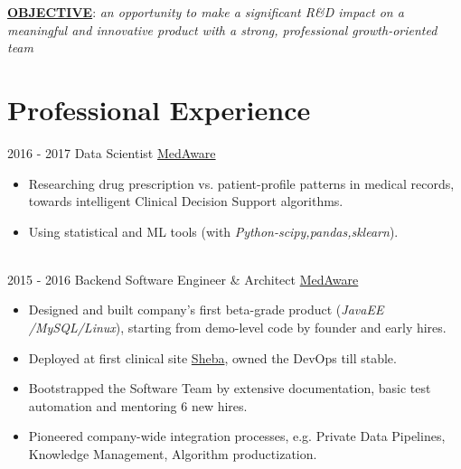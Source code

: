 \documentclass[letterpaper]{twentysecondcv_af} %
\begin{document}
\makeprofile %


{\textbf{\underline{OBJECTIVE}}: \textit{an opportunity to make a significant R\&D impact on a meaningful and innovative product with a strong, professional growth-oriented team} } 

\section{Professional Experience}

\begin{twenty} %
	\twentyitem
    	{2016 -}
		{2017}
        {Data Scientist}
        {\href{http://www.medaware.com/}{MedAware}}
        {}
        {
        {\begin{itemize}
        \item Researching drug prescription vs. patient-profile patterns in medical records, towards intelligent Clinical Decision Support algorithms.	
        \item Using statistical and ML tools (with \textit{Python-scipy,pandas,sklearn}).        
	\end{itemize}}
        }
    \\   
    \twentyitem
   	{2015 -}
		{2016}
        {Backend Software Engineer \& Architect}        
        {\color{blue}  \href{http://www.medaware.com/}{MedAware}}
        {}
        {
        {\begin{itemize}
        \item Designed and built company's first beta-grade product (\textit{JavaEE /MySQL/Linux}), starting from demo-level code by founder and early hires.
        \item Deployed at first clinical site \@{\href{https://eng.sheba.co.il/About_Sheba_Medical_Center}{Sheba}}, owned the DevOps till stable.
        \item Bootstrapped the Software Team by extensive documentation, basic test automation and mentoring 6 new hires.
        \item Pioneered company-wide integration processes, e.g. Private Data Pipelines, Knowledge Management, Algorithm productization.
	\end{itemize}}
        }
     \\
     \twentyitem

\end{twenty}
\end{document}
